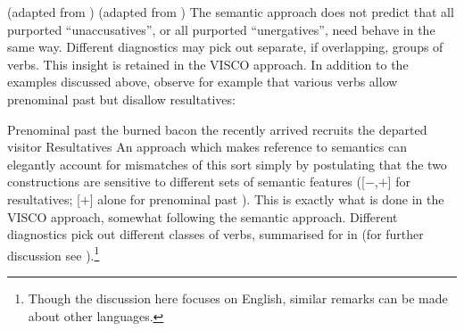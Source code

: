 \documentclass[output=paper]{langsci/langscibook}
\begin{document}
\ea\label{ex:19.35}  (adapted from \citealt[140]{Zaenen1993})
    \z
\ex \label{ex:19.36}  (adapted from \citealt[131]{Zaenen1993})
    \z
\z
The semantic approach does not predict that all purported
\enquote{unaccusatives}, or all purported \enquote{unergatives}, need behave in
the same way. Different diagnostics may pick out separate, if overlapping,
groups of verbs. This insight is retained in the VISCO approach. In addition to
the examples discussed above, observe for example that various verbs allow
prenominal past  but disallow resultatives:\largerpage[-1]

\ea Prenominal past 
    \ea the burned bacon
    \ex the recently arrived recruits
    \ex the departed visitor
    \z
\ex Resultatives
    \z
\z
An approach which makes reference to semantics can elegantly account for
mismatches of this sort simply by postulating that the two constructions are
sensitive to different sets of semantic features ([$-$\Initiation{},$+$\Change{}] for
resultatives; [$+$\Change{}] alone for prenominal past ). This is
exactly what is done in the VISCO approach, somewhat following the semantic
approach. Different diagnostics pick out different classes of verbs, summarised
for  in  (for further discussion see
\citealt{Baker2018,Baker2019}).\footnote{Though the discussion here focuses on
English, similar remarks can be made about other languages.}\largerpage[-2]
\end{document}
